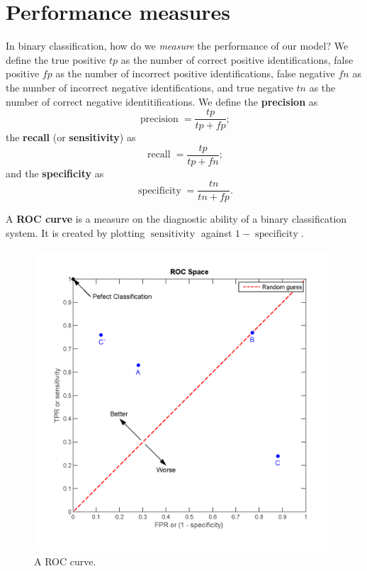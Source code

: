\section{Performance measures}

In binary classification, how do we \emph{measure} the performance of our model?
We define the true positive $tp$ as the number of correct positive identifications,
false positive $fp$ as the number of incorrect positive identifications,
false negative $fn$ as the number of incorrect negative identifications, and
true negative $tn$ as the number of correct negative identitifications.
We define the \textbf{precision} as
\[
    \operatorname{precision} = \frac{tp}{tp + fp};
\]
the \textbf{recall} (or \textbf{sensitivity}) as
\[
    \operatorname{recall} = \frac{tp}{tp + fn};
\]
and the \textbf{specificity} as
\[
    \operatorname{specificity} = \frac{tn}{tn + fp}. 
\]

\begin{definition}
    A \textbf{ROC curve} is a measure on the diagnostic ability of a binary
    classification system.
    It is created by plotting
    $\operatorname{sensitivity}$ against
    $1 - \operatorname{specificity}$.
\end{definition}

\begin{figure}[]
    \centering
    \includegraphics[width=0.8\linewidth]{images/roc-curve.png}
    \caption{A ROC curve.}
    \label{fig:roc-curve}
\end{figure}
